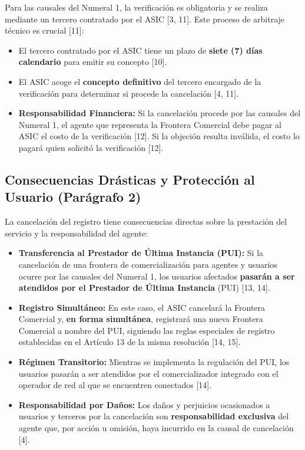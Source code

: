 \documentclass[a5paper]{book}%
\begin{document}
  Para las causales del Numeral 1, la verificación es obligatoria y se realiza mediante un tercero contratado por el ASIC [3, 11]. Este proceso de arbitraje técnico es crucial [11]:
  
  \begin{itemize}
  	\item El tercero contratado por el ASIC tiene un plazo de \textbf{siete (7) días calendario} para emitir su concepto [10].
  	\item El ASIC acoge el \textbf{concepto definitivo} del tercero encargado de la verificación para determinar si procede la cancelación [4, 11].
  	\item \textbf{Responsabilidad Financiera:} Si la cancelación procede por las causales del Numeral 1, el agente que representa la Frontera Comercial debe pagar al ASIC el costo de la verificación [12]. Si la objeción resulta inválida, el costo lo pagará quien solicitó la verificación [12].
  \end{itemize}
  
  \subsection{Consecuencias Drásticas y Protección al Usuario (Parágrafo 2)}
  
  La cancelación del registro tiene consecuencias directas sobre la prestación del servicio y la responsabilidad del agente:
  
  \begin{itemize}
  	\item \textbf{Transferencia al Prestador de Última Instancia (PUI):} Si la cancelación de una frontera de comercialización para agentes y usuarios ocurre por las causales del Numeral 1, los usuarios afectados \textbf{pasarán a ser atendidos por el Prestador de Última Instancia} (PUI) [13, 14].
  	\item \textbf{Registro Simultáneo:} En este caso, el ASIC cancelará la Frontera Comercial y, \textbf{en forma simultánea}, registrará una nueva Frontera Comercial a nombre del PUI, siguiendo las reglas especiales de registro establecidas en el Artículo 13 de la misma resolución [14, 15].
  	\item \textbf{Régimen Transitorio:} Mientras se implementa la regulación del PUI, los usuarios pasarán a ser atendidos por el comercializador integrado con el operador de red al que se encuentren conectados [14].
  	\item \textbf{Responsabilidad por Daños:} Los daños y perjuicios ocasionados a usuarios y terceros por la cancelación son \textbf{responsabilidad exclusiva} del agente que, por acción u omisión, haya incurrido en la causal de cancelación [4].
  \end{itemize}
  
\end{document}
